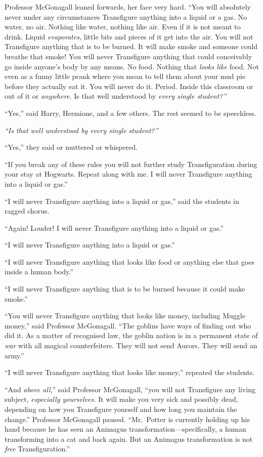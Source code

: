 Professor McGonagall leaned forwards, her face very hard. ``You will
absolutely never under any circumstances Transfigure anything into a
liquid or a gas. No water, no air. Nothing like water, nothing like air.
Even if it is not meant to drink. Liquid \emph{evaporates,} little bits
and pieces of it get into the air. You will not Transfigure anything
that is to be burned. It will make smoke and someone could breathe that
smoke! You will never Transfigure anything that could conceivably go
inside anyone's body by any means. No food. Nothing that \emph{looks
like} food. Not even as a funny little prank where you mean to tell them
about your mud pie before they actually eat it. You will never do it.
Period. Inside this classroom or out of it or \emph{anywhere.} Is that
well understood by \emph{every single student?''}

``Yes,'' said Harry, Hermione, and a few others. The rest seemed to be
speechless.

\emph{``Is that well understood by every single student?''}

``Yes,'' they said or muttered or whispered.

``If you break any of these rules you will not further study
Transfiguration during your stay at Hogwarts. Repeat along with me. I
will never Transfigure anything into a liquid or gas.''

``I will never Transfigure anything into a liquid or gas,'' said the
students in ragged chorus.

``Again! Louder! I will never Transfigure anything into a liquid or
gas.''

``I will never Transfigure anything into a liquid or gas.''

``I will never Transfigure anything that looks like food or anything
else that goes inside a human body.''

``I will never Transfigure anything that is to be burned because it
could make smoke.''

``You will never Transfigure anything that looks like money, including
Muggle money,'' said Professor McGonagall. ``The goblins have ways of
finding out who did it. As a matter of recognised law, the goblin nation
is in a permanent state of \emph{war} with all magical counterfeiters.
They will not send Aurors. They will send an army.''

``I will never Transfigure anything that looks like money,'' repeated
the students.

``And \emph{above all},'' said Professor McGonagall, ``you will not
Transfigure any living subject, \emph{especially yourselves.} It will
make you very sick and possibly dead, depending on how you Transfigure
yourself and how long you maintain the change.'' Professor McGonagall
paused. ``Mr.~Potter is currently holding up his hand because he has
seen an Animagus transformation---specifically, a human transforming
into a cat and back again. But an Animagus transformation is not
\emph{free} Transfiguration.''

